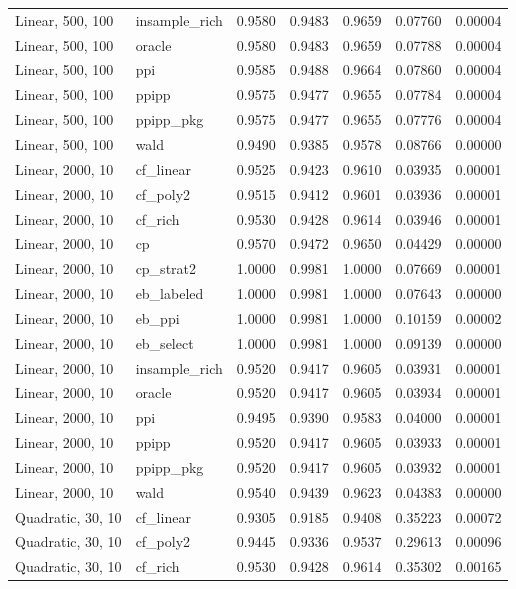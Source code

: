 \begin{longtable}{llrrrrr}
Linear, 500, 100 & insample\_rich & 0.9580 & 0.9483 & 0.9659 & 0.07760 & 0.00004 \\
Linear, 500, 100 & oracle & 0.9580 & 0.9483 & 0.9659 & 0.07788 & 0.00004 \\
Linear, 500, 100 & ppi & 0.9585 & 0.9488 & 0.9664 & 0.07860 & 0.00004 \\
Linear, 500, 100 & ppipp & 0.9575 & 0.9477 & 0.9655 & 0.07784 & 0.00004 \\
Linear, 500, 100 & ppipp\_pkg & 0.9575 & 0.9477 & 0.9655 & 0.07776 & 0.00004 \\
Linear, 500, 100 & wald & 0.9490 & 0.9385 & 0.9578 & 0.08766 & 0.00000 \\
Linear, 2000, 10 & cf\_linear & 0.9525 & 0.9423 & 0.9610 & 0.03935 & 0.00001 \\
Linear, 2000, 10 & cf\_poly2 & 0.9515 & 0.9412 & 0.9601 & 0.03936 & 0.00001 \\
Linear, 2000, 10 & cf\_rich & 0.9530 & 0.9428 & 0.9614 & 0.03946 & 0.00001 \\
Linear, 2000, 10 & cp & 0.9570 & 0.9472 & 0.9650 & 0.04429 & 0.00000 \\
Linear, 2000, 10 & cp\_strat2 & 1.0000 & 0.9981 & 1.0000 & 0.07669 & 0.00001 \\
Linear, 2000, 10 & eb\_labeled & 1.0000 & 0.9981 & 1.0000 & 0.07643 & 0.00000 \\
Linear, 2000, 10 & eb\_ppi & 1.0000 & 0.9981 & 1.0000 & 0.10159 & 0.00002 \\
Linear, 2000, 10 & eb\_select & 1.0000 & 0.9981 & 1.0000 & 0.09139 & 0.00000 \\
Linear, 2000, 10 & insample\_rich & 0.9520 & 0.9417 & 0.9605 & 0.03931 & 0.00001 \\
Linear, 2000, 10 & oracle & 0.9520 & 0.9417 & 0.9605 & 0.03934 & 0.00001 \\
Linear, 2000, 10 & ppi & 0.9495 & 0.9390 & 0.9583 & 0.04000 & 0.00001 \\
Linear, 2000, 10 & ppipp & 0.9520 & 0.9417 & 0.9605 & 0.03933 & 0.00001 \\
Linear, 2000, 10 & ppipp\_pkg & 0.9520 & 0.9417 & 0.9605 & 0.03932 & 0.00001 \\
Linear, 2000, 10 & wald & 0.9540 & 0.9439 & 0.9623 & 0.04383 & 0.00000 \\
Quadratic, 30, 10 & cf\_linear & 0.9305 & 0.9185 & 0.9408 & 0.35223 & 0.00072 \\
Quadratic, 30, 10 & cf\_poly2 & 0.9445 & 0.9336 & 0.9537 & 0.29613 & 0.00096 \\
Quadratic, 30, 10 & cf\_rich & 0.9530 & 0.9428 & 0.9614 & 0.35302 & 0.00165 \\

\end{longtable}
